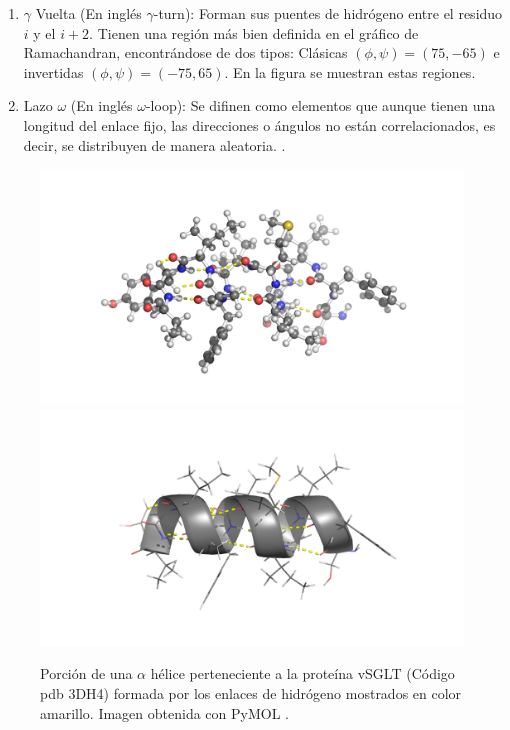 \begin{enumerate}
\begin{enumerate}
 \item $\gamma$ Vuelta (En ingl\'{e}s $\gamma$-turn): Forman sus puentes de hidr\'{o}geno entre el residuo $i$ y el $i+2$. Tienen una regi\'{o}n m\'{a}s bien definida en el gr\'{a}fico de Ramachandran, encontr\'{a}ndose de dos tipos: Cl\'{a}sicas $(\phi,\psi)=(75,-65)$ e invertidas $(\phi,\psi)=(-75,65)$. En la figura \label{fig:Rama} se muestran estas regiones.
  \item Lazo $\omega$ (En ingl\'{e}s $\omega$-loop): Se difinen como elementos que aunque tienen una longitud del enlace fijo, las direcciones o \'{a}ngulos no est\'{a}n correlacionados, es decir, se distribuyen de manera aleatoria. \cite{Smith1996}.
\end{enumerate}
\end{enumerate}
\begin{figure}[H]
\centering
\includegraphics[scale=0.2]{Kap3/helix.png}
\includegraphics[scale=0.2]{Kap3/helix2.png}
\caption{Porci\'{o}n de una $\alpha$ h\'{e}lice perteneciente a la prote\'{i}na vSGLT (C\'{o}digo pdb 3DH4) formada por los enlaces de hidr\'{o}geno mostrados en color amarillo. Imagen obtenida con PyMOL \cite{PyMOL}.}\label{fig:helice}
\end{figure}
